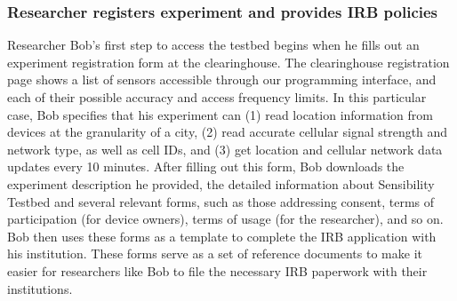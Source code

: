 
\subsubsection{Researcher registers experiment and provides IRB policies}
 Researcher Bob's first step to access the testbed begins when he
fills out an experiment registration form at the 
clearinghouse. The clearinghouse registration page shows 
a list of sensors accessible through our programming interface, and 
each of their possible accuracy and access frequency limits. 
In this particular case, Bob specifies that 
his experiment can (1) read location information
from devices at the granularity of a city, (2) read accurate
cellular signal strength and network type, as well as
cell IDs, and (3) get location and
cellular network data updates every 10 minutes. 
%
After filling out this form, Bob downloads the experiment description 
he provided, the detailed information about Sensibility Testbed and 
several relevant forms, such as 
those addressing consent, terms of participation (for device owners),  
terms of usage (for the researcher), and so on.   
Bob then uses these forms as a template to complete the IRB application 
with his institution. These forms serve as a set of reference documents 
to make it easier for researchers like Bob to 
file the necessary IRB paperwork with their institutions.


